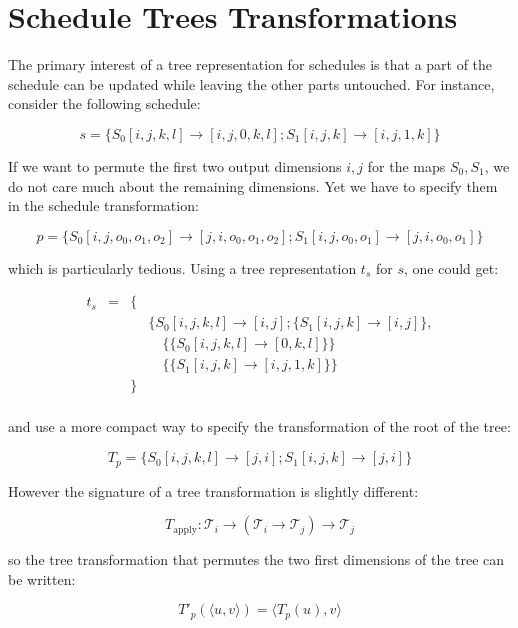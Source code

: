 \documentclass{article}
\begin{document}
\section{Schedule Trees Transformations}
\label{sec:schedule-tree-transformation}

The primary interest of a tree representation for schedules is that a part of
the schedule can be updated while leaving the other parts untouched. For instance, consider the following schedule:

\[
    s = \{ S_0[i,j,k,l] \rightarrow [i,j,0,k,l] ; S_1[i,j,k] \rightarrow [i,j,1,k] \}
\]

If we want to permute the first two output dimensions $i, j$ for the maps
$S_0, S_1$, we do not care much about the remaining dimensions. Yet we have to
specify them in the schedule transformation:

\[
    p = \{ S_0[i,j,o_0,o_1,o_2] \rightarrow [j,i,o_0,o_1,o_2] ; S_1[i,j,o_0, o_1] \rightarrow [j,i,o_0,o_1] \}
\]

\noindent which is particularly tedious. Using a tree representation $t_s$ for $s$, one could get:

\[
    \begin{array}{lcll}
        t_s &=& \{ &\\
            & &    & \{S_0[i,j,k,l] \rightarrow [i,j] ; \{S_1[i,j,k] \rightarrow [i,j] \},\\
            & &    & \quad\{ \{ S_0[i,j,k,l] \rightarrow [0,k,l] \} \}\\
            & &    & \quad\{ \{ S_1[i,j,k] \rightarrow [i,j,1,k] \} \}\\
            & & \} &\\
    \end{array}
\]

\noindent and use a more compact way to specify the transformation of the root of the tree:

\[
    T_p = \{ S_0[i,j,k,l] \rightarrow [j,i] ; S_1[i,j,k] \rightarrow [j,i] \}
\]

However the signature of a tree transformation is slightly different:

\[
    T_\mathrm{apply}: \mathcal{T}_i \rightarrow ( \mathcal{T}_i \rightarrow \mathcal{T}_j) \rightarrow \mathcal{T}_j
\]


\noindent so the tree transformation that permutes the two first dimensions of the tree can be written:

\[
    T'_p(\langle u, v \rangle) = \langle T_p(u), v \rangle
\]
\end{document}

